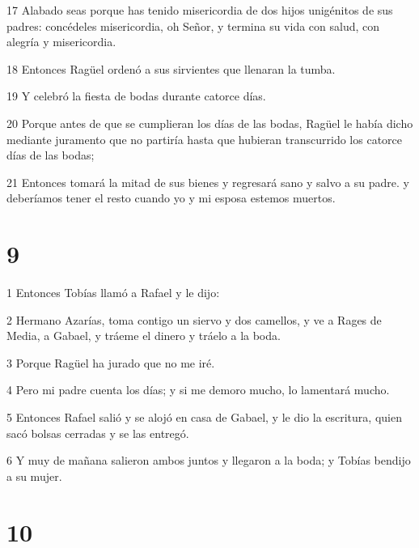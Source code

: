 \par 17 Alabado seas porque has tenido misericordia de dos hijos unigénitos de sus padres: concédeles misericordia, oh Señor, y termina su vida con salud, con alegría y misericordia.
\par 18 Entonces Ragüel ordenó a sus sirvientes que llenaran la tumba.
\par 19 Y celebró la fiesta de bodas durante catorce días.
\par 20 Porque antes de que se cumplieran los días de las bodas, Ragüel le había dicho mediante juramento que no partiría hasta que hubieran transcurrido los catorce días de las bodas;
\par 21 Entonces tomará la mitad de sus bienes y regresará sano y salvo a su padre. y deberíamos tener el resto cuando yo y mi esposa estemos muertos.

\chapter{9}

\par 1 Entonces Tobías llamó a Rafael y le dijo:
\par 2 Hermano Azarías, toma contigo un siervo y dos camellos, y ve a Rages de Media, a Gabael, y tráeme el dinero y tráelo a la boda.
\par 3 Porque Ragüel ha jurado que no me iré.
\par 4 Pero mi padre cuenta los días; y si me demoro mucho, lo lamentará mucho.
\par 5 Entonces Rafael salió y se alojó en casa de Gabael, y le dio la escritura, quien sacó bolsas cerradas y se las entregó.
\par 6 Y muy de mañana salieron ambos juntos y llegaron a la boda; y Tobías bendijo a su mujer.

\chapter{10}

